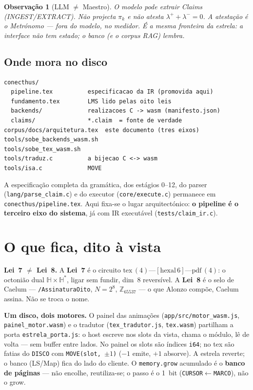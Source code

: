 \documentclass[11pt,a4paper]{article}
\newcommand{\code}[1]{\texttt{\small #1}}
\newtheorem{observacao}[teorema]{Observação}
\begin{document}
\begin{observacao}[LLM $\neq$ Maestro]
O modelo pode extrair Claims (INGEST/EXTRACT). Não projecta $\pi_k$ e não
atesta $\lambda^{+}+\lambda^{-}=0$. A atestação é o Metrónomo --- fora do
modelo, no medidor. É a mesma fronteira da estrela: a interface não tem
estado; o banco (e o corpus RAG) lembra.
\end{observacao}

\subsection*{Onde mora no disco}

\begin{verbatim}
conecthus/
  pipeline.tex          especificacao da IR (promovida aqui)
  fundamento.tex        LMS lido pelas oito leis
  backends/             realizacoes C -> wasm (manifesto.json)
  claims/               *.claim  = fonte de verdade
corpus/docs/arquitetura.tex  este documento (tres eixos)
tools/sobe_backends_wasm.sh
tools/sobe_tex_wasm.sh
tools/traduz.c          a bijecao C <-> wasm
tools/isa.c             MOVE
\end{verbatim}

A especificação completa da gramática, dos estágios 0--12, do parser
(\code{lang/parse\_claim.c}) e do executor (\code{core/execute.c}) permanece
em \code{conecthus/pipeline.tex}. Aqui fixa-se o lugar arquitectónico:
\textbf{o pipeline é o terceiro eixo do sistema}, já com IR executável
(\code{tests/claim\_ir.c}).

\section{O que fica, dito à vista}

\noindent \textbf{Lei~7 $\neq$ Lei~8.} A \textbf{Lei~7} é o circuito
$\text{tex}\,(4)$---$[\text{hexal}\,6]$---$\text{pdf}\,(4)$: o octonião dual
$\mathbb{H}\times\mathbb{H}^{*}$, ligar sem fundir, dim~$8$ reversível. A
\textbf{Lei~8} é o selo de Caelum --- \code{/AssinaturaOito}, $N=2^{8}$,
$\mathbb{Z}_{65537}$ --- o que Alonzo compõe, Caelum assina. Não se troca o nome.

\smallskip
\noindent \textbf{Um disco, dois motores.} O painel das animações
(\code{app/src/motor\_wasm.js}, \code{painel\_motor.wasm}) e o tradutor
(\code{tex\_tradutor.js}, \code{tex.wasm}) partilham a porta
\code{estrela\_porta.js}: o host escreve nos slots da vista, chama o módulo, lê
de volta --- sem buffer entre lados. No painel os slots são índices \code{i64};
no tex são fatias do \code{DISCO} com \code{MOVE(slot,\,$\pm1$)}
($-1$ emite, $+1$ absorve). A estrela reverte; o banco (LS/Map) fica do lado
do cliente. O \code{memory.grow} acumulado é o \textbf{banco de páginas} ---
não encolhe, reutiliza-se; o passo é o 1~bit (\code{CURSOR}$\leftarrow$\code{MARCO}),
não o grow.
\end{document}
